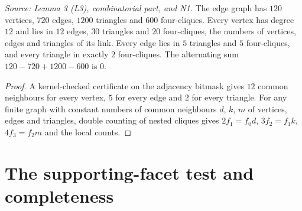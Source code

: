 \begin{theorem}
  \label{thm:face-counts}
  \leanok
  \textit{Source: Lemma 3 (L3), combinatorial part, and N1.}
  The edge graph has \(120\) vertices, \(720\) edges, \(1200\) triangles
  and \(600\) four-cliques. Every vertex has degree \(12\) and lies in
  \(12\) edges, \(30\) triangles and \(20\) four-cliques, the numbers of
  vertices, edges and triangles of its link. Every edge lies in \(5\)
  triangles and \(5\) four-cliques, and every triangle in exactly \(2\)
  four-cliques. The alternating sum \(120-720+1200-600\) is \(0\).
\end{theorem}
\begin{proof}
  \leanok
  A kernel-checked certificate on the adjacency bitmask gives \(12\) common
  neighbours for every vertex, \(5\) for every edge and \(2\) for every
  triangle. For any finite graph with constant numbers of common
  neighbours \(d\), \(k\), \(m\) of vertices, edges and triangles, double
  counting of nested cliques gives \(2f_1=f_0d\), \(3f_2=f_1k\),
  \(4f_3=f_2m\) and the local counts.
\end{proof}

\section{The supporting-facet test and completeness}


